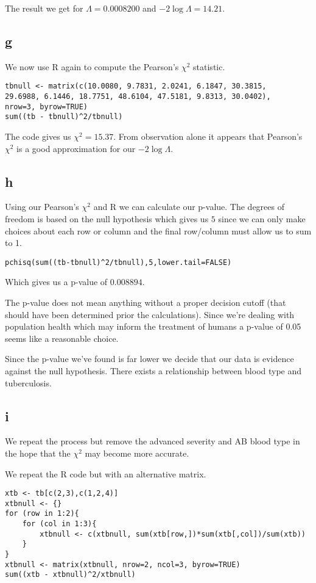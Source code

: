 \documentclass{article}
\begin{document}
The result we get for $\Lambda = 0.0008200$ and $-2\log\Lambda = 14.21$.

\subsection{g}
We now use R again to compute the Pearson's $\chi^2$ statistic.
\begin{verbatim}
tbnull <- matrix(c(10.0080, 9.7831, 2.0241, 6.1847, 30.3815,
29.6988, 6.1446, 18.7751, 48.6104, 47.5181, 9.8313, 30.0402),
nrow=3, byrow=TRUE)
sum((tb - tbnull)^2/tbnull)
\end{verbatim}

The code gives us $\chi^2 = 15.37$. From observation alone it appears that
Pearson's $\chi^2$ is a good approximation for our $-2\log\Lambda$.

\subsection{h}
Using our Pearson's $\chi^2$ and R we can calculate our p-value.
The degrees of freedom is based on the null hypothesis which gives us $5$ since
we can only make choices about each row or column and the final row/column must
allow us to sum to 1.
\begin{verbatim}
pchisq(sum((tb-tbnull)^2/tbnull),5,lower.tail=FALSE)
\end{verbatim}

Which gives us a p-value of $0.008894$.

The p-value does not mean anything without a proper decision cutoff
(that should have been determined prior the calculations). Since we're
dealing with population health which may inform the treatment of humans a
p-value of 0.05 seems like a reasonable choice.

Since the p-value we've found is far lower we decide that our data is evidence
against the null hypothesis. There exists a relationship between
blood type and tuberculosis.

\subsection{i}
We repeat the process but remove the advanced severity and AB blood type in the
hope that the $\chi^2$ may become more accurate.

We repeat the R code but with an alternative matrix.
\begin{verbatim}
xtb <- tb[c(2,3),c(1,2,4)]
xtbnull <- {}
for (row in 1:2){
    for (col in 1:3){
        xtbnull <- c(xtbnull, sum(xtb[row,])*sum(xtb[,col])/sum(xtb))
    }
}
xtbnull <- matrix(xtbnull, nrow=2, ncol=3, byrow=TRUE)
sum((xtb - xtbnull)^2/xtbnull)
\end{verbatim}
\end{document}
